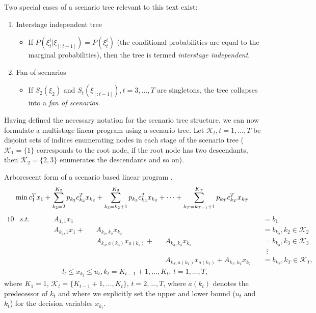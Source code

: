 Two special cases of a scenario tree relevant to this text exist:
\begin{enumerate}
\item Interstage independent tree
	\begin{itemize}
		\item If $P(\xi_t^i|\xi_{[:t-1]})=P(\xi_t^i)$ (the conditional probabilities are equal to the marginal probabilities), then the tree is termed \textit{interstage independent}.
	\end{itemize}
\item Fan of scenarios
	\begin{itemize}
		\item If $S_2(\xi_2)$ and $S_t(\xi_{[:t-1]}), t=3,\dots,T$ are singletons, the tree collapses into a 		\textit{fan of scenarios}.
	\end{itemize}
\end{enumerate}
Having defined the necessary notation for the scenario tree structure, we can now formulate a multistage linear program using a scenario tree. Let $\mathcal{K}_t, t=1,\dots,T$ be disjoint sets of indices enumerating nodes in each stage of the scenario tree ($\mathcal{K}_1=\{1\}$ corresponds to the root node, if the root node has two descendants, then $\mathcal{K}_2=\{2,3\}$ enumerates the descendants and so on).
\newpage
\begin{defn}{Arborescent form of a scenario based linear program \cite[p. 3]{dupacova_scenarios_for_multistage_stochastic_programs}}.
\label{eq:arborescent_linear_programming_formulation}
\footnotesize
\begin{equation}
\mathrm{min} \, c_1^Tx_1 + \sum_{k_2=2}^{K_2}p_{k_2}c_{k_2}^Tx_{k_2} + \sum_{k_3=k_2+1}^{K_3}p_{k_3}c_{k_3}^Tx_{k_3} + \dots +  \sum_{k_T=k_{T-1}+1}^{K_T}p_{k_T}c_{k_T}^Tx_{k_T} \\
\end{equation}
\vspace{-0.5cm}
\begin{alignat}{10}
& s.t. && \, && A_{1,1}x_1 && && \,&&=b_1 \nonumber \\
& && && A_{k_2,1}x_1  + &&A_{k_2,k_2}x_{k_2} && &&=b_{k_2}, k_2 \in \mathcal{K}_2 \nonumber \\
& && && && A_{k_3,a(k_3)}x_{a(k_3)}  + && A_{k_3,k_3}x_{k_3} &&=b_{k_3} , k_3 \in \mathcal{K}_3 \nonumber \\
& && && && && &&  \, \, \, \vdots \nonumber \\
& && && && && A_{k_T,a(k_T)}x_{a(k_T)}  +  A_{k_T,k_T}x_{k_T} &&=b_{k_T} , k_T \in \mathcal{K}_T, \nonumber
\end{alignat}
\vspace{-0.5cm}
\begin{align*}
& l_t \leq x_{k_t} \leq u_t, k_t=K_{t-1}+1,\dots,K_t, \, t=1,\dots,T,  \nonumber
\end{align*}
\normalsize
where $K_1=1$, $\mathcal{K}_t=\{K_{t-1}+1,\dots,K_t\}, \, t=2,\dots,T$, where $a(k_t)$ denotes the predecessor of $k_t$ and where we explicitly set the upper and lower bound ($u_t$ and $k_t$) for the decision variables $x_{k_t}$.
\end{defn}

